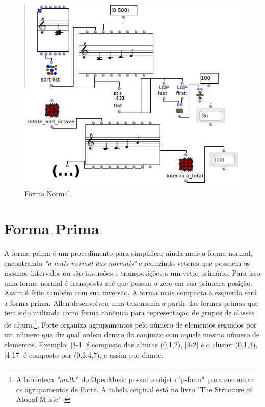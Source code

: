 \documentclass[
	12pt,				%
	openright,			%
	twoside,			%
	a4paper,			%
	english,			%
	french,				%
	spanish,			%
	brazil				%
	]{abntex2}
\begin{document}
\begin{apendicesenv}
\begin{figure}[h]
	\caption{\label{fig_grafico}Forma Normal. }
	\begin{center}
	    \includegraphics[scale=0.7]{OM_settheory/forma_normal.png}
	\end{center}
\end{figure}


\section{Forma Prima} 

A forma prima é um procedimento para simplificar ainda mais a forma normal, encontrando \textit{"a mais normal das normais"} \cite[p. 47]{straus2004} e reduzindo vetores que possuem os mesmos intervalos ou são inversões e transposições a um vetor primário. Para isso uma forma normal é transposta até que possua o zero em sua primeira posição. Assim é feito também com sua inversão. A forma mais compacta à esquerda será a forma prima. Allen  desenvolveu uma taxonomia a partir das formas primas que tem sido utilizada como forma canônica para representação de grupos de classes de altura.\footnote{A biblioteca \textit{"math"}\ do OpenMusic possui o objeto "p-form"\ para encontrar os agrupamentos de Forte. A tabela original está no livro "The Structure of Atonal Music"\ \cite[p.179-181]{forte1973structure}}. Forte organiza agrupamentos pelo número de elementos seguidos por um número que diz qual ordem dentro do conjunto com aquele mesmo número de elementos. Exemplo: |3-1| é composto das alturas (0,1,2), |3-2|  é o cluster (0,1,3), |4-17|  é composto por (0,3,4,7), e assim por diante.


\end{apendicesenv}
\end{document}
